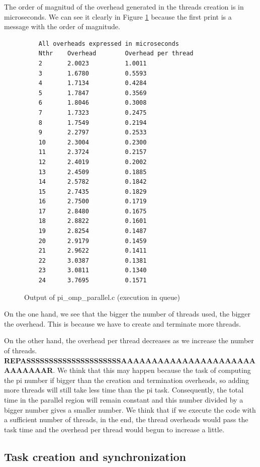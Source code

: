 \documentclass[12pt, a4paper]{article}
\begin{document}
The order of magnitud of the overhead generated in the threads creation is in microseconds. We can see it clearly in Figure \ref{piompparallel} because the first print is a message with the order of magnitude.

\begin{figure}[H]
	\begin{lstlisting}
	All overheads expressed in microseconds
	Nthr    Overhead        Overhead per thread
	2       2.0023          1.0011
	3       1.6780          0.5593
	4       1.7134          0.4284
	5       1.7847          0.3569
	6       1.8046          0.3008
	7       1.7323          0.2475
	8       1.7549          0.2194
	9       2.2797          0.2533
	10      2.3004          0.2300
	11      2.3724          0.2157
	12      2.4019          0.2002
	13      2.4509          0.1885
	14      2.5782          0.1842
	15      2.7435          0.1829
	16      2.7500          0.1719
	17      2.8480          0.1675
	18      2.8822          0.1601
	19      2.8254          0.1487
	20      2.9179          0.1459
	21      2.9622          0.1411
	22      3.0387          0.1381
	23      3.0811          0.1340
	24      3.7695          0.1571
	\end{lstlisting}
	\caption{Output of pi\_omp\_parallel.c (execution in queue)}
	\label{piompparallel}
\end{figure}

On the one hand, we see that the bigger the number of threads used, the bigger the overhead. This is because we have to create and terminate more threads.

On the other hand, the overhead per thread decreases as we increase the number of threads. \textbf{REPASSSSSSSSSSSSSSSSSSSSSAAAAAAAAAAAAAAAAAAAAAAAAAAAAAR}. We think that this may happen because the task of computing the pi number if bigger than the creation and termination overheads, so adding more threads will still take less time than the pi task. Consequently, the total time in the parallel region will remain constant and this number divided by a bigger number gives a smaller number. We think that if we execute the code with a sufficient number of threads, in the end, the thread overheads would pass the task time and the overhead per thread would begun to increase a little.

\subsection{Task creation and synchronization}
\end{document}
